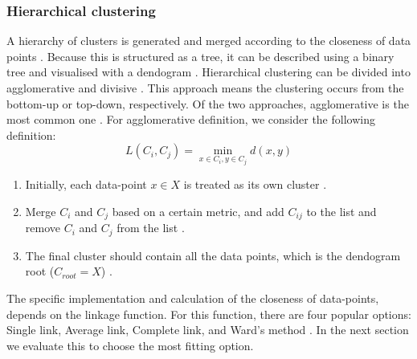 \subsubsection{Hierarchical clustering}
A hierarchy of clusters is generated and merged according to the closeness of data points \citep{meng_private_2021}. Because this is structured as a tree, it can be described using a binary tree and visualised with a dendogram  \citep{nielsen_hierarchical_2016}.
Hierarchical clustering can be divided into agglomerative and divisive \citep{meng_private_2021}.
This approach means the clustering occurs from the bottom-up or top-down, respectively.
Of the two approaches, agglomerative is the most common one \citep{meng_private_2021}.
For  agglomerative definition, we consider the following definition:
\begin{equation}
  L(C_i, C_j) = \min_{x \in C_i, y \in C_j} d(x, y)
\end{equation}
\begin{enumerate}
  \item Initially, each data-point $x \in X$ is treated as its own cluster \citep{nielsen_hierarchical_2016}.
  \item Merge $C_i$ and $C_j$ based on a certain metric, and add $C_{ij}$ to the list and remove $C_i$ and $C_j$ from the list \citep{nielsen_hierarchical_2016}.
  \item The final cluster should contain all the data points, which is the dendogram root ($C_{root} = X$) \citep{nielsen_hierarchical_2016}.
\end{enumerate}
The specific implementation and calculation of the closeness of data-points, depends on the linkage function.
For this function, there are four popular options: Single link, Average link, Complete link, and Ward's method \citep{roux_comparative_2015}. In the next section we evaluate this to choose the most fitting option.

